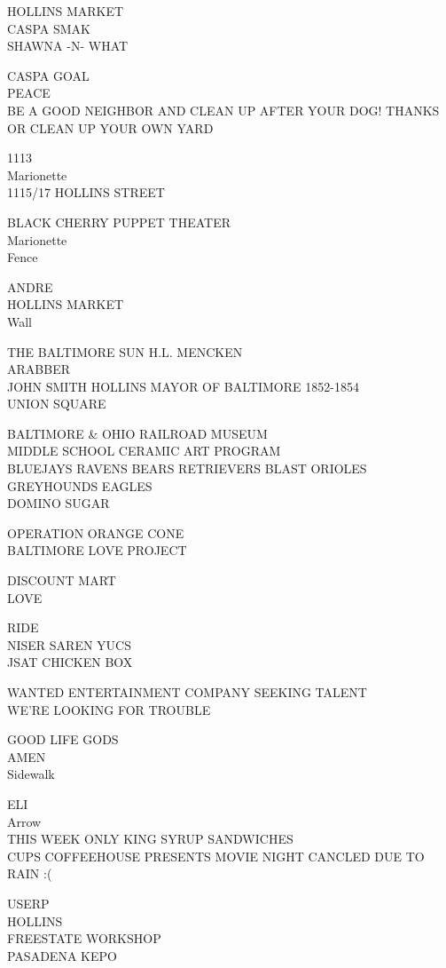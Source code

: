 \documentclass[10pt,letterpaper]{article}
\begin{document}
HOLLINS MARKET\\
CASPA SMAK\\
SHAWNA {-}N{-} WHAT

CASPA GOAL\\
PEACE\\
BE A GOOD NEIGHBOR AND CLEAN UP AFTER YOUR DOG! THANKS OR CLEAN UP YOUR OWN YARD

1113\\
Marionette\\
1115/17 HOLLINS STREET

BLACK CHERRY PUPPET THEATER\\
Marionette\\
Fence

ANDRE\\
HOLLINS MARKET\\
Wall

THE BALTIMORE SUN H.L. MENCKEN\\
ARABBER\\
JOHN SMITH HOLLINS MAYOR OF BALTIMORE 1852{-}1854\\
UNION SQUARE

BALTIMORE \& OHIO RAILROAD MUSEUM\\
MIDDLE SCHOOL CERAMIC ART PROGRAM\\
BLUEJAYS RAVENS BEARS RETRIEVERS BLAST ORIOLES GREYHOUNDS EAGLES\\
DOMINO SUGAR

OPERATION ORANGE CONE\\
BALTIMORE LOVE PROJECT

DISCOUNT MART\\
LOVE

RIDE\\
NISER SAREN YUCS\\
JSAT CHICKEN BOX

WANTED ENTERTAINMENT COMPANY SEEKING TALENT\\
WE'RE LOOKING FOR TROUBLE

GOOD LIFE GODS\\
AMEN\\
Sidewalk

ELI\\
Arrow\\
THIS WEEK ONLY KING SYRUP SANDWICHES\\
CUPS COFFEEHOUSE PRESENTS MOVIE NIGHT CANCLED DUE TO RAIN :(

USERP\\
HOLLINS\\
FREESTATE WORKSHOP\\
PASADENA KEPO
\end{document}
